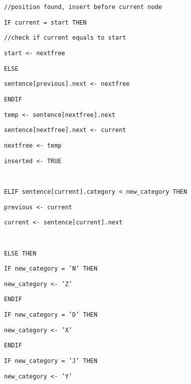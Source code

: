 \begin{minipage}[t]{1\columnwidth}
\texttt{\qquad{}\qquad{}\qquad{}//position found, insert before
current node }

\texttt{\qquad{}\qquad{}\qquad{}\qquad{}IF current = start THEN }

\texttt{\qquad{}\qquad{}\qquad{}\qquad{}\qquad{}//check if current
equals to start}

\texttt{\qquad{}\qquad{}\qquad{}\qquad{}\qquad{}start <- nextfree }

\texttt{\qquad{}\qquad{}\qquad{}\qquad{}ELSE }

\texttt{\qquad{}\qquad{}\qquad{}\qquad{}\qquad{}sentence{[}previous{]}.next
<- nextfree}

\texttt{\qquad{}\qquad{}\qquad{}\qquad{}ENDIF \bigskip{}
}

\texttt{\qquad{}\qquad{}\qquad{}\qquad{}temp <- sentence{[}nextfree{]}.next}

\texttt{\qquad{}\qquad{}\qquad{}\qquad{}sentence{[}nextfree{]}.next
<- current}

\texttt{\qquad{}\qquad{}\qquad{}\qquad{}nextfree <- temp}

\texttt{\qquad{}\qquad{}\qquad{}\qquad{}inserted <- TRUE}

\texttt{\bigskip{}
}

\texttt{\qquad{}\qquad{}\qquad{}ELIF sentence{[}current{]}.category
< new\_category THEN }

\texttt{\qquad{}\qquad{}\qquad{}\qquad{}previous <- current }

\texttt{\qquad{}\qquad{}\qquad{}\qquad{}current <- sentence{[}current{]}.next }

\texttt{\bigskip{}
}

\texttt{\qquad{}\qquad{}\qquad{}ELSE THEN }

\texttt{\qquad{}\qquad{}\qquad{}\qquad{}IF new\_category = 'N'
THEN }

\texttt{\qquad{}\qquad{}\qquad{}\qquad{}\qquad{}new\_category
<- 'Z'}

\texttt{\qquad{}\qquad{}\qquad{}\qquad{}ENDIF }

\texttt{\qquad{}\qquad{}\qquad{}\qquad{}IF new\_category = 'D'
THEN }

\texttt{\qquad{}\qquad{}\qquad{}\qquad{}\qquad{}new\_category
<- 'X' }

\texttt{\qquad{}\qquad{}\qquad{}\qquad{}ENDIF }

\texttt{\qquad{}\qquad{}\qquad{}\qquad{}IF new\_category = 'J'
THEN }

\texttt{\qquad{}\qquad{}\qquad{}\qquad{}\qquad{}new\_category
<- 'Y' }


\end{minipage}
